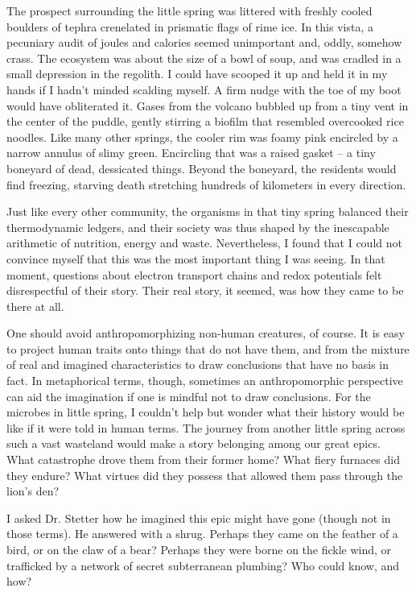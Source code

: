 The prospect surrounding the little spring was littered with freshly cooled boulders of tephra crenelated in prismatic flags of rime ice. In this vista, a pecuniary audit of joules and calories seemed unimportant and, oddly, somehow crass. The ecosystem was about the size of a bowl of soup, and was cradled in a small depression in the regolith. I could have scooped it up and held it in my hands if I hadn't minded scalding myself. A firm nudge with the toe of my boot would have obliterated it. Gases from the volcano bubbled up from a tiny vent in the center of the puddle, gently stirring a biofilm that resembled overcooked rice noodles. Like many other springs, the cooler rim was foamy pink encircled by a narrow annulus of slimy green. Encircling that was a raised gasket -- a tiny boneyard of dead, dessicated things. Beyond the boneyard, the residents would find freezing, starving death stretching hundreds of kilometers in every direction. 

Just like every other community, the organisms in that tiny spring balanced their thermodynamic ledgers, and their society was thus shaped by the inescapable arithmetic of nutrition, energy and waste. Nevertheless, I found that I could not convince myself that this was the most important thing I was seeing. In that moment, questions about electron transport chains and redox potentials felt disrespectful of their story. Their real story, it seemed, was how they came to be there at all.

One should avoid anthropomorphizing non-human creatures, of course. It is easy to project human traits onto things that do not have them, and from the mixture of real and imagined characteristics to draw conclusions that have no basis in fact. In metaphorical terms, though, sometimes an anthropomorphic perspective can aid the imagination if one is mindful not to draw conclusions. For the microbes in little spring, I couldn't help but wonder what their history would be like if it were told in human terms. The journey from another little spring across such a vast wasteland would make a story belonging among our great epics. What catastrophe drove them from their former home? What fiery furnaces did they endure? What virtues did they possess that allowed them pass through the lion's den?

I asked Dr. Stetter how he imagined this epic might have gone (though not in those terms). He answered with a shrug. Perhaps they came on the feather of a bird, or on the claw of a bear? Perhaps they were borne on the fickle wind, or trafficked by a network of secret subterranean plumbing? Who could know, and how?

